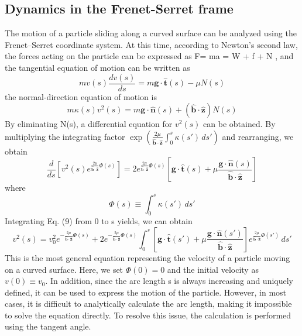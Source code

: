 \documentclass[11pt,letterpaper]{article}
\begin{document}
\subsection{Dynamics in the Frenet-Serret frame}
The motion of a particle sliding along a curved surface can be analyzed using the Frenet–Serret coordinate system.
 At this time, according to Newton’s second law, the forces acting on the particle can be expressed as F= ma = W + f + N
, and the tangential equation of motion can be written as \begin{equation}
m v(s)\frac{dv(s)}{ds}
=
m\mathbf g\cdot\hat{\mathbf t}(s)
-\mu N(s)
\tag{7}
\end{equation}
the normal-direction equation of motion is \begin{equation}
m\kappa(s)v^2(s)
=
m\mathbf g\cdot\hat{\mathbf n}(s)
+
(\hat{\mathbf b}\cdot\hat{\mathbf z})N(s)
\tag{8}
\end{equation}
By eliminating N(s), a differential equation for $v^2(s)$ can be obtained.
By multiplying the integrating factor $\exp\!\left(\frac{2\mu}{\hat{\mathbf b}\cdot\hat{\mathbf z}}\int_0^s\kappa(s')\,ds'\right)$ and rearranging,
we obtain \begin{equation}
\frac{d}{ds}
\left[
v^2(s)
e^{\frac{2\mu}{\hat{\mathbf b}\cdot\hat{\mathbf z}}\Phi(s)}
\right]
=
2
e^{\frac{2\mu}{\hat{\mathbf b}\cdot\hat{\mathbf z}}\Phi(s)}
\left[
\mathbf g\cdot\hat{\mathbf t}(s)
+
\mu
\frac{\mathbf g\cdot\hat{\mathbf n}(s)}
{\hat{\mathbf b}\cdot\hat{\mathbf z}}
\right]
\tag{9}
\end{equation}
where \begin{equation}
\Phi(s)
\equiv
\int_0^s \kappa(s')\,ds'
\tag{10}
\end{equation}
Integrating Eq. (9) from 0 to s yields, we can obtain \begin{equation}
v^2(s)
=
v_0^2
e^{-\frac{2\mu}{\hat{\mathbf b}\cdot\hat{\mathbf z}}\Phi(s)}
+
2
e^{-\frac{2\mu}{\hat{\mathbf b}\cdot\hat{\mathbf z}}\Phi(s)}
\int_0^s
\left[
\mathbf g\cdot\hat{\mathbf t}(s')
+
\mu
\frac{\mathbf g\cdot\hat{\mathbf n}(s')}
{\hat{\mathbf b}\cdot\hat{\mathbf z}}
\right]
e^{\frac{2\mu}{\hat{\mathbf b}\cdot\hat{\mathbf z}}\Phi(s')}
\,ds'
\tag{11}
\end{equation}
This is the most general equation representing the velocity of a particle moving on a curved surface. Here, we set $\Phi(0)=0$ and the initial velocity as $v(0)\equiv v_0$. In addition, since the arc length s is always increasing and uniquely defined, it can be used to express the motion of the particle. However, in most cases, it is difficult to analytically calculate the arc length, making it impossible to solve the equation directly. To resolve this issue, the calculation is performed using the tangent angle.
\end{document}

